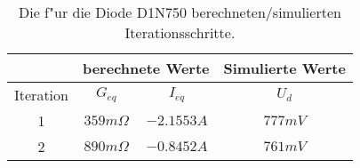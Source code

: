 \begin{table}[!htp]
\begin{center}
\small
\begin{tabular}
{| c || c | c || c|}   %
\hline
 & \multicolumn{2}{|c|}{berechnete Werte} & Simulierte Werte \\ \hline
Iteration & $G_{eq}$ & $I_{eq}$ & $U_d$ \\ \hline
1 & $359m\Omega$ & $-2.1553 A$ & $777mV$ \\ \hline
2 & $890m\Omega$ & $-0.8452 A$ & $761mV$ \\ \hline
\end{tabular}
\caption{Die f"ur die Diode D1N750 berechneten/simulierten Iterationsschritte.\label{tab:diodwerte2}}
\end{center}
\end{table}



